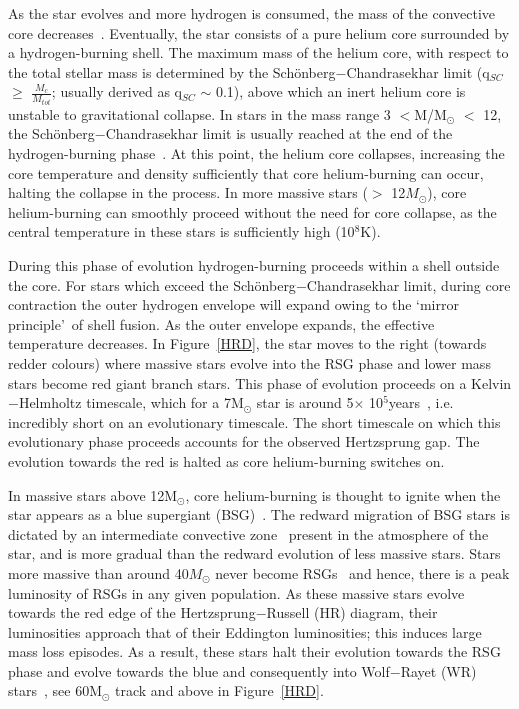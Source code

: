 As the star evolves and more hydrogen is consumed, the mass of the convective core decreases~\citep{b:KippenhahnWeigert}.
Eventually, the star consists of a pure helium core surrounded by a hydrogen-burning shell.
The maximum mass of the helium core, with respect to the total stellar mass is determined by the Sch\"onberg$-$Chandrasekhar limit (q$_{SC}$ $\geq$ $\frac{M_{c}}{M_{tot}}$; usually derived as q$_{SC}$ $\sim$ 0.1), above which an inert helium core is unstable to gravitational collapse.
In stars in the mass range 3 $<$M/M$_{\odot}$ $<$ 12, the Sch\"onberg$-$Chandrasekhar limit is usually reached at the end of the hydrogen-burning phase~\citep{b:SalarisCassisi05}.
At this point, the helium core collapses, increasing the core temperature and density sufficiently that core helium-burning can occur, halting the collapse in the process.
In more massive stars ($>$ 12$M_{\odot}$), core helium-burning can smoothly proceed without the need for core collapse, as the central temperature in these stars is sufficiently high (10$^{8}$K).

During this phase of evolution hydrogen-burning proceeds within a shell outside the core.
For stars which exceed the Sch\"onberg$-$Chandrasekhar limit, during core contraction the outer hydrogen envelope will expand owing to the \textquoteleft mirror principle\textquoteright ~of shell fusion.\footnotemark
{}
As the outer envelope expands, the effective temperature decreases.
In Figure~\ref{HRD}, the star moves to the right (towards redder colours) where massive stars evolve into the RSG phase and lower mass stars become red giant branch stars.
This phase of evolution proceeds on a Kelvin$-$Helmholtz timescale, which for a 7M$_{\odot}$ star is around 5$\times$ 10$^{5}$years~\citep{b:KippenhahnWeigert}, i.e. incredibly short on an evolutionary timescale.
The short timescale on which this evolutionary phase proceeds accounts for the observed Hertzsprung gap.
The evolution towards the red is halted as core helium-burning switches on.

In massive stars above 12M$_{\odot}$, core helium-burning is thought to ignite when the star appears as a blue supergiant (BSG)~\citep{Meynet11,Ekstrom12,Langer12,Saio13}.
The redward migration of BSG stars is dictated by an intermediate convective zone~\citep{Meynet11} present in the atmosphere of the star, and is more gradual than the redward evolution of less massive stars.
Stars more massive than around 40$M_{\odot}$ never become RSGs~\citep{Massey03,Meynet11,Ekstrom12} and hence, there is a peak luminosity of RSGs in any given population.
As these massive stars evolve towards the red edge of the Hertzsprung$-$Russell (HR) diagram, their luminosities approach that of their Eddington luminosities; this induces large mass loss episodes.
As a result, these stars halt their evolution towards the RSG phase and evolve towards the blue and consequently into Wolf$-$Rayet (WR) stars~\citep{Crowther07, Vink09}, see 60M$_{\odot}$ track and above in Figure~\ref{HRD}.

